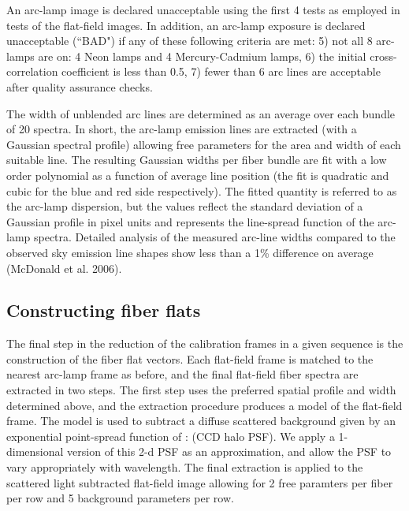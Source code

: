 \documentclass[12pt,preprint]{aastex}
\begin{document}
An arc-lamp image is declared unacceptable using the first 4 tests as employed
in tests of the flat-field images.  In addition, an arc-lamp exposure
is declared unacceptable (``BAD") if any of these following criteria are met:
5) not all 8 arc-lamps are on: 4 Neon lamps and 4 Mercury-Cadmium lamps,
6) the initial cross-correlation coefficient is less than 0.5,
7) fewer than 6 arc lines are acceptable after quality assurance checks.

The width of unblended arc lines are determined as an average over
each bundle of 20 spectra.  In short, the arc-lamp emission lines 
are extracted (with a Gaussian spectral profile) 
allowing free parameters for the area and width of each suitable line.
The resulting Gaussian widths per fiber bundle are fit 
with a low order polynomial as a function of average line position
(the fit is quadratic and cubic for the blue and red side respectively).
The fitted quantity is referred to as the arc-lamp dispersion,
but the values reflect the standard deviation of a Gaussian 
profile in pixel units and represents the line-spread function of the 
arc-lamp spectra.  Detailed analysis of the measured arc-line widths
compared to the observed sky emission line shapes show less than a 1\%
difference on average (McDonald et al. 2006). 


\subsection{Constructing fiber flats}

The final step in the reduction of the calibration frames in a given
sequence is the construction of the fiber flat vectors.  Each flat-field
frame is matched to the nearest arc-lamp frame as before, and the
final flat-field fiber spectra are extracted in two steps.  The first
step uses the preferred spatial profile and width determined above,
and the extraction procedure produces a model of the flat-field frame.
The model is used to subtract a diffuse scattered background given
by an exponential point-spread function of :  (CCD halo PSF).
We apply a 1-dimensional version of this 2-d PSF as an approximation,
and allow the PSF to vary appropriately with wavelength.
The final extraction is applied to the scattered light subtracted flat-field
image allowing for 2 free paramters per fiber per row and 
5 background parameters per row.
\end{document}
